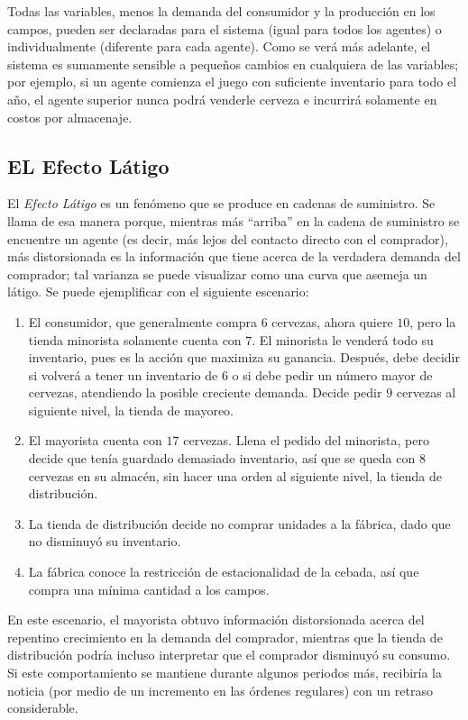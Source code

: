 Todas las variables, menos la demanda del consumidor y la producci\'on en los campos, pueden ser declaradas para el sistema (igual para todos los agentes) o individualmente (diferente para cada agente). Como se ver\'a m\'as adelante, el sistema es sumamente sensible a peque\~nos cambios en cualquiera de las variables; por ejemplo, si un agente comienza el juego con suficiente inventario para todo el a\~no, el agente superior nunca podr\'a venderle cerveza e incurrir\'a solamente en costos por almacenaje.

\subsection{EL Efecto Látigo}

El \textit{Efecto Látigo} es un fen\'omeno que se produce en cadenas de suministro. Se llama de esa manera porque, mientras m\'as ``arriba'' en la cadena de suministro se encuentre un agente (es decir, m\'as lejos del contacto directo con el comprador), m\'as distorsionada es la informaci\'on que tiene acerca de la verdadera demanda del comprador; tal varianza se puede visualizar como una curva que asemeja un l\'atigo. Se puede ejemplificar con el siguiente escenario:

\begin{enumerate}
    \item El consumidor, que generalmente compra $6$ cervezas, ahora quiere $10$, pero la tienda minorista solamente cuenta con $7$. El minorista le venderá todo su inventario, pues es la acci\'on que maximiza su ganancia. Despu\'es, debe decidir si volverá a tener un inventario de $6$ o si debe pedir un número mayor de cervezas, atendiendo la posible creciente demanda. Decide pedir $9$ cervezas al siguiente nivel, la tienda de mayoreo.
    \item El mayorista cuenta con $17$ cervezas. Llena el pedido del minorista, pero decide que ten\'ia guardado demasiado inventario, as\'i que se queda con $8$ cervezas en su almac\'en, sin hacer una orden al siguiente nivel, la tienda de distribución.
    \item La tienda de distribuci\'on decide no comprar unidades a la f\'abrica, dado que no disminuy\'o su inventario.
    \item La f\'abrica conoce la restricci\'on de estacionalidad de la cebada, as\'i que compra una m\'inima cantidad a los campos.
\end{enumerate}

En este escenario, el mayorista obtuvo informaci\'on distorsionada acerca del repentino crecimiento en la demanda del comprador, mientras que la tienda de distribución podr\'ia incluso interpretar que el comprador disminuy\'o su consumo. Si este comportamiento se mantiene durante algunos periodos m\'as, recibir\'ia la noticia (por medio de un incremento en las \'ordenes regulares) con un retraso considerable.\\

